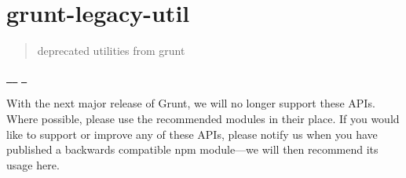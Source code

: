 \chapter{grunt-\/legacy-\/util}
\hypertarget{md__c_1_2_users_2_s_t_r_i_d_e_r_2source_2repos_2_ainslie_a_p_i_2wwwroot_2lib_2jquery-ui_2node__m4fcb0c5113df2b6506cf14267bef5d2f}{}\label{md__c_1_2_users_2_s_t_r_i_d_e_r_2source_2repos_2_ainslie_a_p_i_2wwwroot_2lib_2jquery-ui_2node__m4fcb0c5113df2b6506cf14267bef5d2f}
\label{md__c_1_2_users_2_s_t_r_i_d_e_r_2source_2repos_2_ainslie_a_p_i_2wwwroot_2lib_2jquery-ui_2node__m4fcb0c5113df2b6506cf14267bef5d2f_autotoc_md9158}%
%
\begin{quote}
deprecated utilities from grunt \end{quote}
\href{https://travis-ci.org/gruntjs/grunt-legacy-util}{\texttt{ }} \href{https://ci.appveyor.com/project/gruntjs/grunt-legacy-util/branch/master}{\texttt{ }} \href{http://gruntjs.com/}{\texttt{ }}

With the next major release of Grunt, we will no longer support these APIs. Where possible, please use the recommended modules in their place. If you would like to support or improve any of these APIs, please notify us when you have published a backwards compatible npm module---we will then recommend its usage here.

